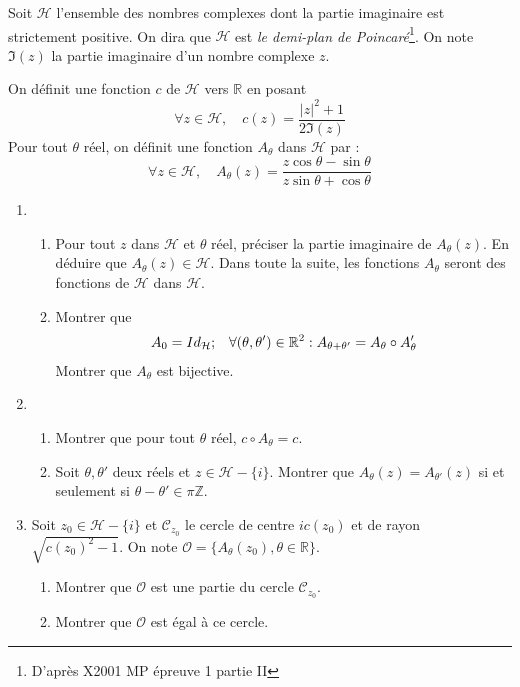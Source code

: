 Soit $\mathcal{H}$ l'ensemble des nombres complexes dont la partie imaginaire est strictement positive. On dira que $\mathcal{H}$ est \emph{le demi-plan de Poincar{\'e}}\footnote{D'apr{\`e}s X2001 MP {\'e}preuve 1 partie II}. On note $\Im(z)$ la partie imaginaire d'un nombre complexe $z$.

On d{\'e}finit une fonction $c$ de $\mathcal{H}$ vers $\mathbb{R}$ en posant
\begin{displaymath}
\forall z \in \mathcal{H},\quad c(z)=\frac{|z|^2+1}{2\Im (z)} 
\end{displaymath}
Pour tout $\theta$ réel, on définit une fonction $A_\theta$ dans $\mathcal{H}$ par :
\begin{displaymath}
 \forall z \in \mathcal{H},\quad A_\theta(z)=\frac{z\cos\theta-\sin\theta}{z\sin\theta+\cos\theta}
\end{displaymath}

\begin{enumerate}
  \item
 \begin{enumerate}
 \item Pour tout $z$ dans $\mathcal{H}$ et $\theta$ r{\'e}el, pr{\'e}ciser la partie imaginaire de $A_\theta(z)$.\newline
En déduire que $A_\theta(z)\in \mathcal{H}$.\newline
Dans toute la suite, les fonctions $A_\theta$ seront des fonctions de $\mathcal{H}$ dans $\mathcal{H}$.

 \item  Montrer que 
\begin{align*}
 A_0= Id_\mathcal{H} &;
& \forall (\theta , \theta^\prime)\in \mathbb{R}^2 : A_{\theta+\theta^\prime} = A_\theta \circ A_\theta^\prime
\end{align*}
Montrer que $A_\theta$ est bijective.
\end{enumerate}
  \item
\begin{enumerate}
  \item Montrer que pour tout $\theta$ r{\'e}el, $c\circ A_\theta=c$.
  \item Soit $\theta,\theta '$ deux r{\'e}els et $z\in\mathcal{H}-\{i\}$.\newline
Montrer que $A_\theta(z)=A_{\theta'}(z)$ si et seulement si $\theta -\theta '\in \pi \mathbb{Z}$.
\end{enumerate}
  \item Soit $z_0 \in \mathcal{H}-\{i\}$ et $\mathcal{C}_{z_0}$ le cercle de centre $ic(z_0)$ et de rayon $\sqrt{c(z_0)^2-1}$.\newline
On note $\mathcal{O}=\{A_\theta(z_0),\theta \in \mathbb{R}\}$.
\begin{enumerate}
 \item Montrer que $\mathcal{O}$ est une partie du cercle $\mathcal{C}_{z_0}$.
  \item Montrer que $\mathcal{O}$ est {\'e}gal {\`a} ce cercle.
\end{enumerate}
\end{enumerate}
